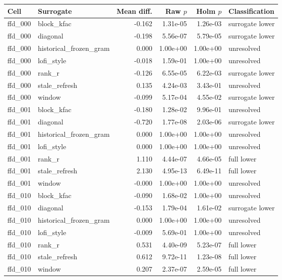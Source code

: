 \begin{table}[p]
\centering\tiny
\begin{tabular}{llrrrl}
\toprule
Cell & Surrogate & Mean diff. & Raw $p$ & Holm $p$ & Classification \\
\midrule
ffd\_000 & block\_kfac & -0.162 & 1.31e-05 & 1.26e-03 & surrogate lower \\
ffd\_000 & diagonal & -0.198 & 5.56e-07 & 5.79e-05 & surrogate lower \\
ffd\_000 & historical\_frozen\_gram & 0.000 & 1.00e+00 & 1.00e+00 & unresolved \\
ffd\_000 & lofi\_style & -0.018 & 1.59e-01 & 1.00e+00 & unresolved \\
ffd\_000 & rank\_r & -0.126 & 6.55e-05 & 6.22e-03 & surrogate lower \\
ffd\_000 & stale\_refresh & 0.135 & 4.24e-03 & 3.43e-01 & unresolved \\
ffd\_000 & window & -0.099 & 5.17e-04 & 4.55e-02 & surrogate lower \\
ffd\_001 & block\_kfac & -0.180 & 1.28e-02 & 9.96e-01 & unresolved \\
ffd\_001 & diagonal & -0.720 & 1.77e-08 & 2.03e-06 & surrogate lower \\
ffd\_001 & historical\_frozen\_gram & 0.000 & 1.00e+00 & 1.00e+00 & unresolved \\
ffd\_001 & lofi\_style & 0.000 & 1.00e+00 & 1.00e+00 & unresolved \\
ffd\_001 & rank\_r & 1.110 & 4.44e-07 & 4.66e-05 & full lower \\
ffd\_001 & stale\_refresh & 2.130 & 4.95e-13 & 6.49e-11 & full lower \\
ffd\_001 & window & -0.000 & 1.00e+00 & 1.00e+00 & unresolved \\
ffd\_010 & block\_kfac & -0.090 & 1.68e-02 & 1.00e+00 & unresolved \\
ffd\_010 & diagonal & -0.153 & 1.79e-04 & 1.61e-02 & surrogate lower \\
ffd\_010 & historical\_frozen\_gram & 0.000 & 1.00e+00 & 1.00e+00 & unresolved \\
ffd\_010 & lofi\_style & -0.009 & 5.69e-01 & 1.00e+00 & unresolved \\
ffd\_010 & rank\_r & 0.531 & 4.40e-09 & 5.23e-07 & full lower \\
ffd\_010 & stale\_refresh & 0.612 & 9.72e-11 & 1.23e-08 & full lower \\
ffd\_010 & window & 0.207 & 2.37e-07 & 2.59e-05 & full lower \\

\end{tabular}
\end{table}
